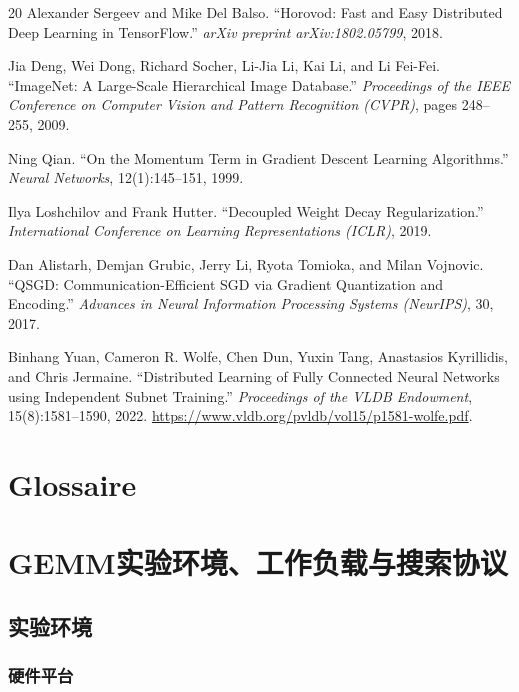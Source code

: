 \documentclass[a4paper,11pt,oneside]{article}
\begin{document}
\begin{thebibliography}{20}
Alexander Sergeev and Mike Del Balso.
``Horovod: Fast and Easy Distributed Deep Learning in TensorFlow.''
\textit{arXiv preprint arXiv:1802.05799}, 2018.

Jia Deng, Wei Dong, Richard Socher, Li-Jia Li, Kai Li, and Li Fei-Fei.
``ImageNet: A Large-Scale Hierarchical Image Database.''
\textit{Proceedings of the IEEE Conference on Computer Vision and Pattern Recognition (CVPR)}, pages 248--255, 2009.

Ning Qian.
``On the Momentum Term in Gradient Descent Learning Algorithms.''
\textit{Neural Networks}, 12(1):145--151, 1999.

Ilya Loshchilov and Frank Hutter.
``Decoupled Weight Decay Regularization.''
\textit{International Conference on Learning Representations (ICLR)}, 2019.

Dan Alistarh, Demjan Grubic, Jerry Li, Ryota Tomioka, and Milan Vojnovic.
``QSGD: Communication-Efficient SGD via Gradient Quantization and Encoding.''
\textit{Advances in Neural Information Processing Systems (NeurIPS)}, 30, 2017.

Binhang Yuan, Cameron R. Wolfe, Chen Dun, Yuxin Tang, Anastasios Kyrillidis, and Chris Jermaine.
``Distributed Learning of Fully Connected Neural Networks using Independent Subnet Training.''
\textit{Proceedings of the VLDB Endowment}, 15(8):1581--1590, 2022.
\url{https://www.vldb.org/pvldb/vol15/p1581-wolfe.pdf}.

\end{thebibliography}

\section*{Glossaire}

\appendix

\section{GEMM实验环境、工作负载与搜索协议}\label{app:gemm_setup}

\subsection{实验环境}

\subsubsection{硬件平台}
\end{document}

